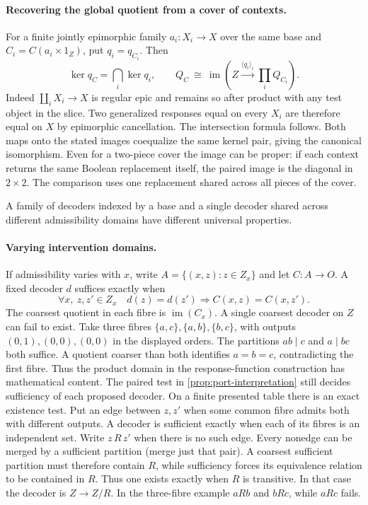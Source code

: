 \documentclass[11pt,a4paper]{article}
\theoremstyle{definition}
\theoremstyle{remark}\newaliascnt{remark}{theorem}
\numberwithin{equation}{section}
\begin{document}
\paragraph{Recovering the global quotient from a cover of contexts.}
For a finite jointly epimorphic family \(a_i:X_i\to X\) over the same base and \(C_i=C(a_i\times 1_Z)\), put \(q_i=q_{C_i}\). Then
\[
 \ker q_C=\bigcap_i\ker q_i,\qquad
 Q_C\ \cong\ \operatorname{im}\!\left(Z\xrightarrow{\langle q_i\rangle_i}\prod_i Q_{C_i}\right).
\]
Indeed \(\coprod_i X_i\to X\) is regular epic and remains so after product with any test object in the slice. Two generalized responses equal on every \(X_i\) are therefore equal on \(X\) by epimorphic cancellation. The intersection formula follows. Both maps onto the stated images coequalize the same kernel pair, giving the canonical isomorphism. Even for a two-piece cover the image can be proper: if each context returns the same Boolean replacement itself, the paired image is the diagonal in \(2\times2\). The comparison uses one replacement shared across all pieces of the cover.

A family of decoders indexed by a base and a single decoder shared across different admissibility domains have different universal properties.
\paragraph{Varying intervention domains.}
If admissibility varies with \(x\), write \(A=\{(x,z):z\in Z_x\}\) and let \(C:A\to O\). A fixed decoder \(d\) suffices exactly when
\[
 \forall x,\ z,z'\in Z_x\quad d(z)=d(z')\Longrightarrow C(x,z)=C(x,z').
\]
The coarsest quotient in each fibre is \(\operatorname{im}(C_x)\). A single coarsest decoder on \(Z\) can fail to exist. Take three fibres \(\{a,c\},\{a,b\},\{b,c\}\), with outputs \((0,1),(0,0),(0,0)\) in the displayed orders. The partitions \(ab\mid c\) and \(a\mid bc\) both suffice. A quotient coarser than both identifies \(a=b=c\), contradicting the first fibre. Thus the product domain in the response-function construction has mathematical content. The paired test in \cref{prop:port-interpretation} still decides sufficiency of each proposed decoder.
On a finite presented table there is an exact existence test. Put an edge between \(z,z'\) when some common fibre admits both with different outputs. A decoder is sufficient exactly when each of its fibres is an independent set. Write \(z\,R\,z'\) when there is no such edge. Every nonedge can be merged by a sufficient partition (merge just that pair). A coarsest sufficient partition must therefore contain \(R\), while sufficiency forces its equivalence relation to be contained in \(R\). Thus one exists exactly when \(R\) is transitive. In that case the decoder is \(Z\to Z/R\). In the three-fibre example \(aRb\) and \(bRc\), while \(aRc\) fails.
\end{document}
